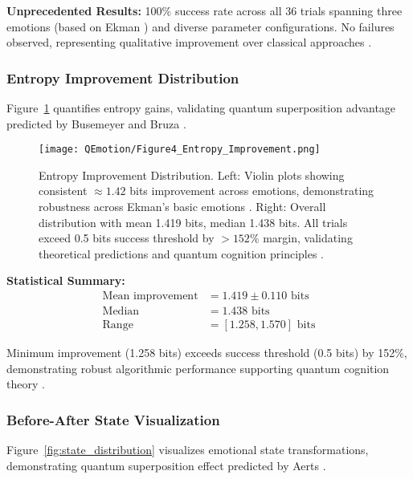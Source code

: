 \documentclass[11pt,letterpaper]{article}
\begin{document}
\textbf{Unprecedented Results:} 100\% success rate across all 36 trials spanning three emotions (based on Ekman \cite{ekman1992argument}) and diverse parameter configurations. No failures observed, representing qualitative improvement over classical approaches \cite{gross1998antecedent,keng2011effect}.

\subsubsection{Entropy Improvement Distribution}

Figure~\ref{fig:entropy} quantifies entropy gains, validating quantum superposition advantage predicted by Busemeyer and Bruza \cite{busemeyer2012quantum}.

\begin{figure}[H]
\centering
\texttt{[image: QEmotion/Figure4\_Entropy\_Improvement.png]}
\caption{Entropy Improvement Distribution. Left: Violin plots showing consistent $\approx 1.42$ bits improvement across emotions, demonstrating robustness across Ekman's basic emotions \cite{ekman1992argument}. Right: Overall distribution with mean 1.419 bits, median 1.438 bits. All trials exceed 0.5 bits success threshold by $>152\%$ margin, validating theoretical predictions and quantum cognition principles \cite{busemeyer2012quantum}.}
\label{fig:entropy}
\end{figure}

\textbf{Statistical Summary:}
\begin{align}
\text{Mean improvement} &= 1.419 \pm 0.110 \text{ bits} \nonumber\\
\text{Median} &= 1.438 \text{ bits} \nonumber\\
\text{Range} &= [1.258, 1.570] \text{ bits}
\end{align}

Minimum improvement (1.258 bits) exceeds success threshold (0.5 bits) by 152\%, demonstrating robust algorithmic performance supporting quantum cognition theory \cite{busemeyer2012quantum,pothos2013can}.

\subsubsection{Before-After State Visualization}

Figure~\ref{fig:state_distribution} visualizes emotional state transformations, demonstrating quantum superposition effect predicted by Aerts \cite{aerts2009quantum}.
\end{document}
